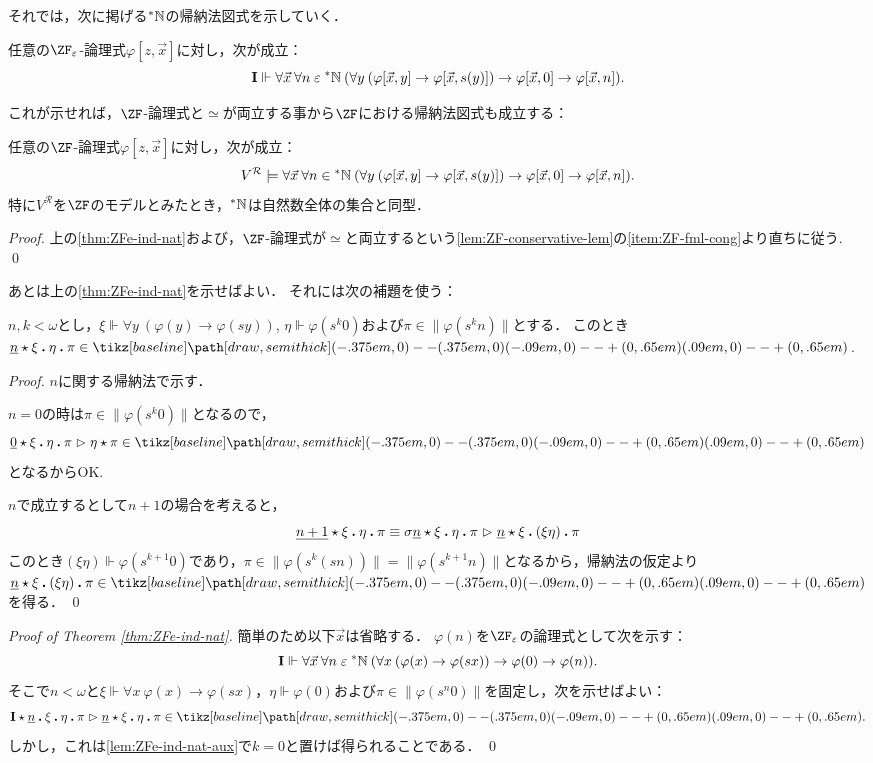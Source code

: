 \documentclass[realisability.tex]{subfiles}
\begin{document}
それでは，次に掲げる$\mathord{{}^{*}\mathbb{N}}$の帰納法図式を示していく．
\begin{theorem} \label{thm:ZFe-ind-nat}
 任意の$\ZF_{\varepsilon}$-論理式$\varphi[z, \vec{x}]$に対し，次が成立：
 \[
  \mathsf{\mathbf{I}} \Vdash \forall \vec{x}\: \forall n \mathrel{\varepsilon} \mathord{{}^{*}\mathbb{N}} \:(\forall y\: (\varphi[\vec{x}, y] \to \varphi[\vec{x}, s(y)]) \to \varphi[\vec{x}, 0] \to \varphi[\vec{x}, n]).
 \]
\end{theorem}
これが示せれば，$\ZF$-論理式と$\simeq$が両立する事から$\ZF$における帰納法図式も成立する：
\begin{corollary}\label{cor:ZF-ind-nat}
 任意の$\ZF$-論理式$\varphi[z, \vec{x}]$に対し，次が成立：
 \[
  V^{\mathcal{R}} \models \forall \vec{x}\: \forall n \in \mathord{{}^{*}\mathbb{N}} \:(\forall y\: (\varphi[\vec{x}, y] \to \varphi[\vec{x}, s(y)]) \to \varphi[\vec{x}, 0] \to \varphi[\vec{x}, n]).
 \]
 特に$V^{\mathcal{R}}$を$\ZF$のモデルとみたとき，$\mathord{{}^{*}\mathbb{N}}$は自然数全体の集合と同型．
\end{corollary}
\begin{proof}
 上の\cref{thm:ZFe-ind-nat}および，$\ZF$-論理式が$\simeq$と両立するという\cref{lem:ZF-conservative-lem}の\ref{item:ZF-fml-cong}より直ちに従う. \qed
\end{proof}
あとは上の\cref{thm:ZFe-ind-nat}を示せばよい．
それには次の補題を使う：
\begin{lemma}\label{lem:ZFe-ind-nat-aux}
 $n, k < \omega$とし，$\xi \Vdash \forall y\: (\varphi(y) \to \varphi(s y))$, $\eta \Vdash \varphi(s^k 0)$および$\pi \in \|\varphi(s^k n)\|$とする．
 このとき$\KVM{{{\num n}} \xi \eta \pi} \in \pole$.
\end{lemma}
\begin{proof}
 $n$に関する帰納法で示す．

 $n = 0$の時は$\pi \in \|\varphi(s^k 0)\|$となるので，
 \[
  \KVM{{{\num 0}} \xi \eta \pi} \redsto \KVM{\eta \pi} \in \pole
 \]
 となるからOK.

 $n$で成立するとして$n + 1$の場合を考えると，
 \[
  \KVM{{{\num{n+1}}} \xi \eta \pi} \equiv
  \KVM{{\sigma \num{n}} \xi \eta \pi} \redsto
  \KVM{{{\num{n}}} \xi {(\xi \eta)} \pi}
 \]
 このとき$(\xi\eta) \Vdash \varphi(s^{k+1} 0)$であり，$\pi \in \|\varphi(s^k(s n))\| = \|\varphi(s^{k+1} n)\|$となるから，帰納法の仮定より$\KVM{{{\num{n}}} \xi {(\xi \eta)} \pi} \in \pole$を得る． \qed
\end{proof}

\begin{proof}[Proof of Theorem \ref{thm:ZFe-ind-nat}]
 簡単のため以下$\vec{x}$は省略する．
 $\varphi(n)$を$\ZF_{\varepsilon}$の論理式として次を示す：
  \[
  \mathsf{\mathbf{I}} \Vdash \forall \vec{x}\: \forall n \mathrel{\varepsilon} \mathord{{}^{*}\mathbb{N}} \:(\forall x\: (\varphi(x) \to \varphi(sx)) \to \varphi(0) \to \varphi(n)).
 \]
 そこで$n < \omega$と$\xi \Vdash \forall x \: \varphi(x) \to \varphi(s x)$，$\eta \Vdash \varphi(0)$および$\pi \in \|\varphi(s^n 0)\|$を固定し，次を示せばよい：
 \[
  \KVM{{\I}{{\num{n}}} \xi\eta {\pi}} \redsto
  \KVM{{{\num{n}}} \xi \eta \pi} \in \pole.
 \]
 しかし，これは\cref{lem:ZFe-ind-nat-aux}で$k = 0$と置けば得られることである． \qed
\end{proof}
\end{document}
